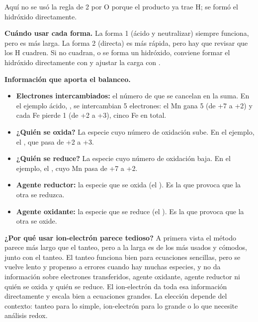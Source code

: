 Aquí no se usó la regla de 2  por O porque el producto
ya trae H; se formó el hidróxido directamente.

\begin{notaimportante}
\textbf{Cuándo usar cada forma.} La forma 1 (ácido y neutralizar)
siempre funciona, pero es más larga. La forma 2 (directa) es más
rápida, pero hay que revisar que los H cuadren. Si no cuadran, o
se forma un hidróxido, conviene formar el hidróxido directamente
con  y ajustar la carga con .
\end{notaimportante}

\medskip
\textbf{Información que aporta el balanceo.}

\begin{itemize}
    \item \textbf{Electrones intercambiados:} el número de 
    que se cancelan en la suma. En el ejemplo ácido,
    ,
    se intercambian 5 electrones: el Mn gana 5 (de +7 a +2) y
    cada Fe pierde 1 (de +2 a +3), cinco Fe en total.
    \item \textbf{¿Quién se oxida?} La especie cuyo número de
    oxidación sube. En el ejemplo, el , que pasa de
    +2 a +3.
    \item \textbf{¿Quién se reduce?} La especie cuyo número de
    oxidación baja. En el ejemplo, el , cuyo Mn pasa
    de +7 a +2.
    \item \textbf{Agente reductor:} la especie que se oxida (el
    ). Es la que provoca que la otra se reduzca.
    \item \textbf{Agente oxidante:} la especie que se reduce (el
    ). Es la que provoca que la otra se oxide.
\end{itemize}

\medskip
\begin{notaimportante}
\textbf{¿Por qué usar ion-electrón parece tedioso?} A primera
vista el método parece más largo que el tanteo, pero a la larga
es de los más usados y cómodos, junto con el tanteo. El tanteo
funciona bien para ecuaciones sencillas, pero se vuelve lento y
propenso a errores cuando hay muchas especies, y no da
información sobre electrones transferidos, agente oxidante,
agente reductor ni quién se oxida y quién se reduce. El
ion-electrón da toda esa información directamente y escala bien
a ecuaciones grandes. La elección depende del contexto: tanteo
para lo simple, ion-electrón para lo grande o lo que necesite
análisis redox.
\end{notaimportante}


